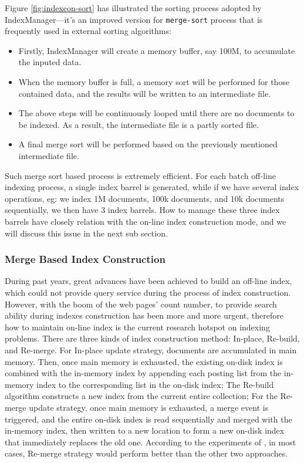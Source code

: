 Figure \ref{fig:indexcon-sort} has illustrated the sorting process adopted by IndexManager---it's an improved version for \texttt{merge-sort} process that is frequently used in external sorting algorithms:
\begin{itemize}
 \item Firstly, IndexManager will create a memory buffer, say 100M, to accumulate the inputed data.
 \item When the memory buffer is full, a memory sort will be performed for those contained data, and the results will be written to an intermediate file.
 \item The above steps will be continuously looped until there are no documents to be indexed. As a result, the intermediate file is a partly sorted file.
 \item A final merge sort will be performed based on the previously mentioned intermediate file.
\end{itemize}

Such merge sort based process is extremely efficient. For each batch off-line indexing process, a single index barrel is generated, while if we have several index operations, 
eg: we index 1M documents, 100k documents, and 10k documents sequentially, we then have 3 index barrels. How to manage these three index barrels have closely relation with the
on-line index construction mode, and we will discuss this issue in the next sub section.


\subsubsection{Merge Based Index Construction} \label{indexcon-merge}
During past years, great advances have been achieved to build an off-line index, which could not provide query service during the process of index construction. However, with the boom of the web pages' count number, 
to provide search ability during indexes construction has been more and more urgent, therefore how to maintain on-line index is the current research hotspot on indexing problems. There are three kinds of index construction
method: In-place, Re-build, and Re-merge\cite{lester2004pvr}. For In-place update strategy, documents are accumulated in main memory. Then, once main memory is exhausted, the existing on-disk index is combined with 
the in-memory index by appending each posting list from the in-memory index to the corresponding list in the on-disk index; The Re-build algorithm constructs a new index from the current entire collection; For the Re-merge 
update strategy, once main memory is exhausted, a merge event is triggered, and the entire on-disk index is read sequentially and merged with the in-memory index, then written to a new location to form a new on-disk index
that immediately replaces the old one. According to the experiments of \cite{lester2004pvr}, in most cases, Re-merge strategy would perform better than the other two approaches. 


